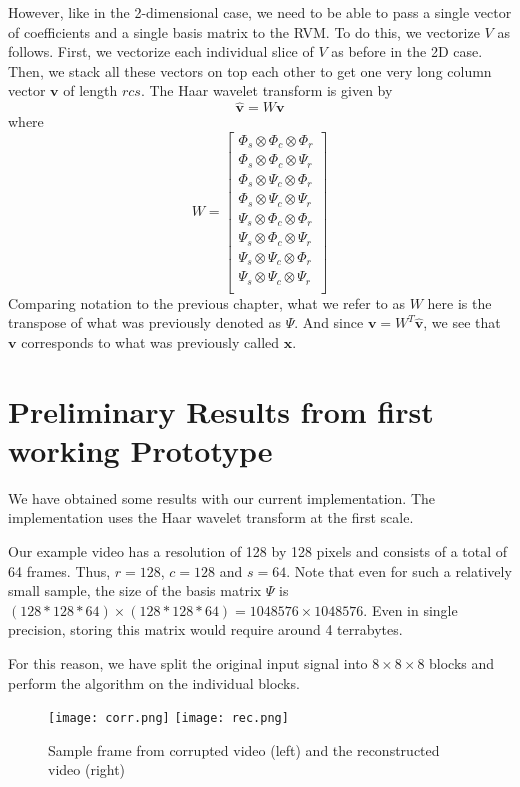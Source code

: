 \documentclass[final,3p]{report}
\let\bs\boldsymbol
\begin{document}
However, like in the 2-dimensional case, we need to be able to pass a single vector of coefficients and a single basis matrix to the RVM.
To do this, we vectorize $V$ as follows. 
First, we vectorize each individual slice of $V$ as before in the 2D case.
Then, we stack all these vectors on top each other to get one very long column vector $\bs v$ of length $rcs$.
The Haar wavelet transform is given by 
\begin{equation*}
\hat{\bs v} = W \bs v
\end{equation*}
where 
\begin{equation*}
W = 
\begin{bmatrix}
\Phi_s \otimes \Phi_c \otimes \Phi_r \\
\Phi_s \otimes \Phi_c \otimes \Psi_r \\
\Phi_s \otimes \Psi_c \otimes \Phi_r \\
\Phi_s \otimes \Psi_c \otimes \Psi_r \\
\Psi_s \otimes \Phi_c \otimes \Phi_r \\
\Psi_s \otimes \Phi_c \otimes \Psi_r \\
\Psi_s \otimes \Psi_c \otimes \Phi_r \\
\Psi_s \otimes \Psi_c \otimes \Psi_r \\
\end{bmatrix}
\end{equation*}
Comparing notation to the previous chapter, what we refer to as $W$ here is the transpose of what was previously denoted as $\Psi$.
And since $\bs v = W^T \hat{\bs v}$, we see that $\bs v$ corresponds to what was previously called $\bs x$. 

\section{Preliminary Results from first working Prototype}
We have obtained some results with our current implementation.
The implementation uses the Haar wavelet transform at the first scale.

Our example video has a resolution of 128 by 128 pixels and consists of a total of 64 frames.
Thus, $r = 128$, $c = 128$ and $s = 64$.
Note that even for such a relatively small sample, the size of the basis matrix $\Psi$ is $(128*128*64)\times(128*128*64) = 1048576\times 1048576$.
Even in single precision, storing this matrix would require around 4 terrabytes.

For this reason, we have split the original input signal into $8\times 8\times 8$ blocks and perform the algorithm on the individual blocks.
\begin{figure}
\label{fig:foreman}
\texttt{[image: corr.png]}
\texttt{[image: rec.png]}
\caption{Sample frame from corrupted video (left) and the reconstructed video (right)}
\end{figure}
\end{document}
